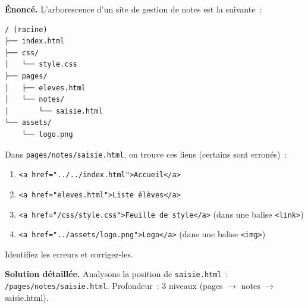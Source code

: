 \documentclass[11pt]{article}
\begin{document}
\begin{exoresolu}
\textbf{Énoncé.}
L'arborescence d'un site de gestion de notes est la suivante~:
\begin{lstlisting}
/ (racine)
├── index.html
├── css/
│   └── style.css
├── pages/
│   ├── eleves.html
│   └── notes/
│       └── saisie.html
└── assets/
    └── logo.png
\end{lstlisting}
Dans \texttt{pages/notes/saisie.html}, on trouve ces liens (certains sont erronés)~:
\begin{enumerate}
    \item \texttt{<a href="../../index.html">Accueil</a>}
    \item \texttt{<a href="eleves.html">Liste élèves</a>}
    \item \texttt{<a href="/css/style.css">Feuille de style</a>} (dans une balise \texttt{<link>})
    \item \texttt{<a href="../assets/logo.png">Logo</a>} (dans une balise \texttt{<img>})
\end{enumerate}
Identifiez les erreurs et corrigez-les.

\textbf{Solution détaillée.}
Analysons la position de \texttt{saisie.html}~: \texttt{/pages/notes/saisie.html}. Profondeur~: 3 niveaux (pages $\to$ notes $\to$ saisie.html).


\end{exoresolu}
\end{document}
